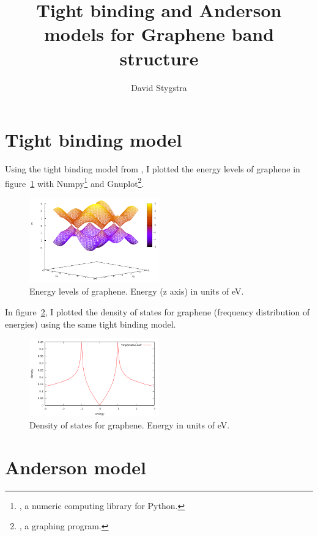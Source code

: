 \documentclass{revtex4}
\begin{document}
\title{Tight binding and Anderson models for Graphene band structure}
\author{David Stygstra}

\maketitle

\section{Tight binding model}

Using the tight binding model from \cite{reich2002}, I plotted the energy levels of graphene in figure~\ref{fig:energies-analytic} with Numpy\footnote{\urlnumpy, a numeric computing library for Python.} and Gnuplot\footnote{\urlgnuplot, a graphing program.}.

\begin{figure}[h!]
\includegraphics[width=0.5\textwidth]{energies-analytic-wireframe.png}
\caption{Energy levels of graphene. Energy (z axis) in units of eV.}
\label{fig:energies-analytic}
\end{figure}

In figure~\ref{fig:states-analytic}, I plotted the density of states for graphene (frequency distribution of energies) using the same tight binding model.

\begin{figure}[h!]
\includegraphics[width=0.5\textwidth]{states-analytic.png}
\caption{Density of states for graphene. Energy in units of eV.}
\label{fig:states-analytic}
\end{figure}

\section{Anderson model}
\end{document}
